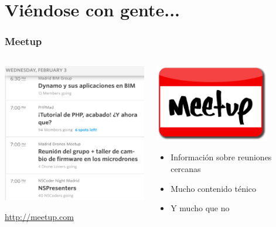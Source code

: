 %
%

\section{Viéndose con gente...}

\begin{frame}
\frametitle{Meetup}

\begin{columns}[T]
\begin{column}{.48\textwidth}
\includegraphics[width=6.5cm]{figs/meetup-calendar}

\begin{flushright}
  {\Large
    \url{http://meetup.com}
  }
\end{flushright}

\end{column}%
\hfill%
\begin{column}{.50\textwidth}
  \begin{flushright}
    \includegraphics[width=5cm]{figs/meetup-logo}
  \end{flushright}
{\Large
\begin{itemize}
\item Información sobre reuniones cercanas
\item Mucho contenido ténico
\item Y mucho que no
\end{itemize}
}
\end{column}%
\end{columns}

\end{frame}

